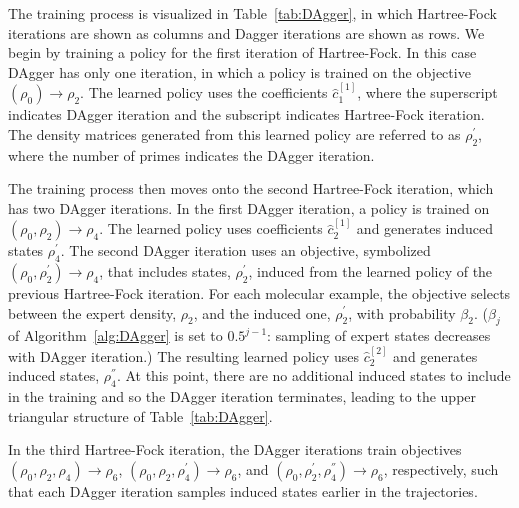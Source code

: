 \documentclass[twoside,11pt]{article}
\begin{document}

The training process is visualized in Table~\ref{tab:DAgger}, in which Hartree-Fock iterations are shown as columns and Dagger iterations are shown as rows. We begin by training a policy for the first iteration of Hartree-Fock. In this case DAgger has only one iteration, in which a policy is trained on the objective $(\rho_0) \rightarrow \rho_2$. The learned policy uses the coefficients $\hat{c}^{[1]}_1$, where the superscript indicates DAgger iteration and the subscript indicates Hartree-Fock iteration. The density matrices generated from this learned policy are referred to as $\rho_2^{'}$, where the number of primes indicates the DAgger iteration.

The training process then moves onto the second Hartree-Fock iteration, which has two DAgger iterations. In the first DAgger iteration, a policy is trained on $(\rho_0, \rho_2) \rightarrow \rho_4$. The learned policy uses coefficients $\hat{c}^{[1]}_2$ and generates induced states $\rho_4^{'}$. The second DAgger iteration uses an objective, symbolized $(\rho_0, \rho_2^{'}) \rightarrow \rho_4$, that includes states, $\rho_2^{'}$, induced from the learned policy of the previous Hartree-Fock iteration. For each molecular example, the objective selects between the expert density, $\rho_2$, and the induced one, $\rho_2^{'}$, with probability $\beta_2$. ($\beta_j$ of Algorithm~\ref{alg:DAgger} is set to $0.5^{j-1}$: sampling of expert states decreases with DAgger iteration.) The resulting learned policy uses $\hat{c}^{[2]}_2$ and generates induced states, $\rho_4^{''}$. At this point, there are no additional induced states to include in the training and so the DAgger iteration terminates, leading to the upper triangular structure of Table~\ref{tab:DAgger}.

In the third Hartree-Fock iteration, the DAgger iterations train objectives $(\rho_0, \rho_2, \rho_4) \rightarrow \rho_6$, $(\rho_0, \rho_2, \rho_4^{'}) \rightarrow \rho_6$, and $(\rho_0, \rho_2^{'}, \rho_{4}^{''}) \rightarrow \rho_6$, respectively, such that each DAgger iteration samples induced states earlier in the trajectories.  
\end{document}
